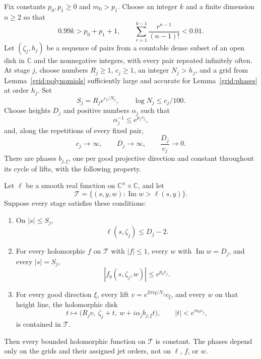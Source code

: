 \begin{proposition}
\label{grid:criterion}
Fix constants $p_0,p_1\ge0$ and $m_0>p_1$.  Choose an integer $k$
and a finite dimension $n\ge2$ so that
\begin{equation}
 \label{grid:exponent-choice}
 0.99k>p_0+p_1+1,
 \qquad
 \sum_{r=1}^{k-1}\frac{r^{n-1}}{(n-1)!}<0.01.
\end{equation}
Let $(\zeta_j,h_j)$ be a sequence of pairs from a countable dense
subset of an open disk in $\mathbb C$ and the nonnegative integers,
with every pair repeated infinitely often.  At stage $j$, choose
numbers $R_j\ge1$, $c_j\ge1$, an integer $N_j>h_j$, and a grid
from Lemma~\ref{grid:polynomials} sufficiently large and accurate
for Lemma~\ref{grid:phases} at order $h_j$.  Set
\[
 S_j=R_j e^{c_j/N_j},\qquad \log N_j\le c_j/100.
\]
Choose heights $D_j$ and positive numbers $\alpha_j$ such that
\[
 \alpha_j^{-1}\le e^{p_1c_j},
\]
and, along the repetitions of every fixed pair,
\begin{equation}
 \label{grid:height-rates}
 c_j\longrightarrow\infty,\qquad
 D_j\longrightarrow\infty,\qquad
 \frac{D_j}{c_j}\longrightarrow0.
\end{equation}
There are phases $b_{j,\xi}$, one per good projective direction
and constant throughout its cycle of lifts, with the following
property.

Let $\ell$ be a smooth real function on $\mathbb C^n\times\mathbb C$,
and let
\[
 \mathcal T=\{(s,y,w):\operatorname{Im}w>\ell(s,y)\}.
\]
Suppose every stage satisfies these conditions:
\begin{enumerate}
\item On $|s|\le S_j$,
\begin{equation}
 \label{grid:height-gap}
 \ell(s,\zeta_j)\le D_j-2.
\end{equation}
\item For every holomorphic $f$ on $\mathcal T$ with $|f|\le1$,
every $w$ with $\operatorname{Im}w=D_j$, and every $|s|=S_j$,
\begin{equation}
 \label{grid:sphere-derivative}
 |f_y(s,\zeta_j,w)|\le e^{p_0c_j}.
\end{equation}
\item For every good direction $\xi$, every lift
$v=e^{2\pi iq/N_j}v_\xi$, and every $w$ on that height line, the
holomorphic disk
\begin{equation}
 \label{grid:sheared-disk}
 t\longmapsto
 \bigl(R_jv,\ \zeta_j+t,\ w+i\alpha_j b_{j,\xi}t\bigr),
 \qquad |t|<e^{m_0c_j},
\end{equation}
is contained in $\mathcal T$.
\end{enumerate}
Then every bounded holomorphic function on $\mathcal T$ is constant.
The phases depend only on the grids and their assigned jet orders,
not on $\ell$, $f$, or $w$.
\end{proposition}

